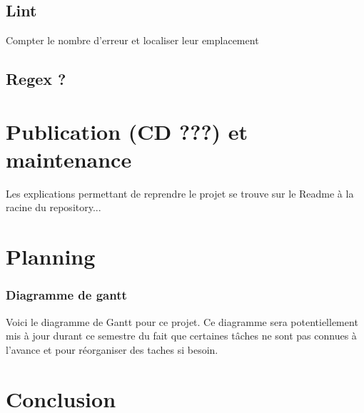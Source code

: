 \documentclass[
    iict, %
    il, %
]{heig-tb}
\begin{document}
\section{Lint}
Compter le nombre d'erreur et localiser leur emplacement

\section{Regex ?}


\chapter{Publication (CD ???) et maintenance}


Les explications permettant de  reprendre le projet se trouve sur le Readme à la racine du repository...

\chapter{Planning}


\subsection{Diagramme de gantt}
Voici le diagramme de Gantt pour ce projet.
Ce diagramme sera potentiellement mis à jour durant ce semestre du fait que certaines tâches ne sont pas connues à l'avance et pour réorganiser des taches si besoin.



\chapter{Conclusion}
\end{document}
